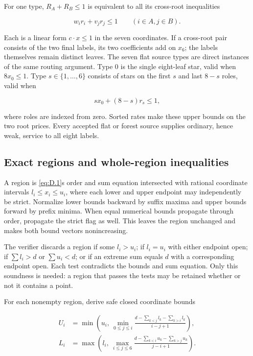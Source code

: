 \documentclass[11pt,a4paper]{article}
\begin{document}
For one type, \(R_A+R_B\le1\) is equivalent to all its cross-root inequalities

\begin{equation}
w_i r_i+v_jr_j\le1\qquad(i\in A, j\in B).
\tag{D.5}\label{eq:D.5}
\end{equation}

Each is a linear form \(c\cdot x\le1\) in the seven coordinates. If a cross-root pair consists of the two final labels, its two coefficients add on \(x_6\); the labels themselves remain distinct leaves. The seven flat source types are direct instances of the same routing argument. Type 0 is the single eight-leaf star, valid when \(8x_0\le1\). Type \(s\in\{1,\ldots,6\}\) consists of stars on the first \(s\) and last \(8-s\) roles, valid when

\begin{equation}
s x_0+(8-s)r_s\le1,
\tag{D.6}\label{eq:D.6}
\end{equation}

where roles are indexed from zero. Sorted rates make these upper bounds on the two root prices. Every accepted flat or forest source supplies ordinary, hence weak, service to all eight labels.

\subsection{Exact regions and whole-region inequalities}\label{sec:D.3}

A region is \eqref{eq:D.1}\textquotesingle s order and sum equation intersected with rational coordinate intervals \(l_i\le x_i\le u_i\), where each lower and upper endpoint may independently be strict. Normalize lower bounds backward by suffix maxima and upper bounds forward by prefix minima. When equal numerical bounds propagate through order, propagate the strict flag as well. This leaves the region unchanged and makes both bound vectors nonincreasing.

The verifier discards a region if some \(l_i>u_i\); if \(l_i=u_i\) with either endpoint open; if \(\sum l_i>d\) or \(\sum u_i<d\); or if an extreme sum equals \(d\) with a corresponding endpoint open. Each test contradicts the bounds and sum equation. Only this soundness is needed: a region that passes the tests may be retained whether or not it contains a point.

For each nonempty region, derive safe closed coordinate bounds

\begin{equation}
\begin{aligned}
 U_i&=\min\left(u_i,\ \min_{0\le j\le i}
 \frac{d-\sum_{k<j}l_k-\sum_{k>i}l_k}{i-j+1}\right),\\
 L_i&=\max\left(l_i,\ \max_{i\le j\le6}
 \frac{d-\sum_{k<i}u_k-\sum_{k>j}u_k}{j-i+1}\right).
\end{aligned}
\tag{D.7}\label{eq:D.7}
\end{equation}
\end{document}
